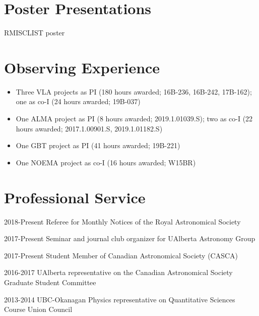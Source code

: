 \documentclass[letterpaper,11pt]{article}
\newlength{\mainindent} \setlength{\mainindent}{12pt}
\newlength{\contentindent} \setlength{\contentindent}{19ex}
\newenvironment{datelist}{
  \begingroup
  \raggedright
  \begin{description}[labelindent=\mainindent,leftmargin=\contentindent,
      style=sameline,font=\normalfont,topsep=0pt,partopsep=0pt,parsep=0pt,
      itemsep=4pt]
}{
  \end{description}
  \endgroup
}
\begin{document}
\section*{Poster Presentations}
\begin{datelist}
RMISCLIST poster
\end{datelist}



\section*{Observing Experience}
\begin{itemize}
\item Three VLA projects as PI (180 hours awarded; 16B-236, 16B-242, 17B-162); one as co-I (24 hours awarded; 19B-037)
\item One ALMA project as PI (8 hours awarded; 2019.1.01039.S); two as co-I (22 hours awarded; 2017.1.00901.S, 2019.1.01182.S)
\item One GBT project as PI (41 hours awarded; 19B-221)
\item One NOEMA project as co-I (16 hours awarded; W15BR)
\end{itemize}

\section*{Professional Service}
\begin{datelist}

\item[2018-Present] Referee for Monthly Notices of the Royal Astronomical Society
\item[2017-Present] Seminar and journal club organizer for UAlberta Astronomy Group
\item[2017-Present] Student Member of Canadian Astronomical Society (CASCA)
\item[2016-2017] UAlberta representative on the Canadian Astronomical Society Graduate Student Committee
\item[2013-2014] UBC-Okanagan Physics representative on Quantitative Sciences Course Union Council

\end{datelist}
\end{document}
